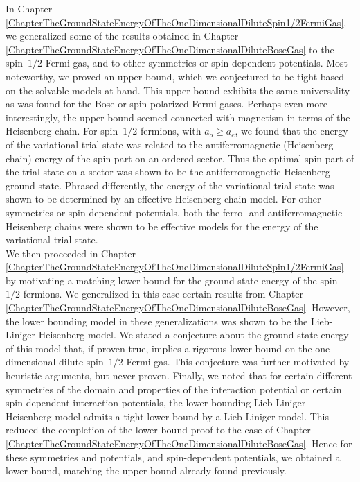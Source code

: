 In Chapter \ref{ChapterTheGroundStateEnergyOfTheOneDimensionalDiluteSpin1/2FermiGas}, we generalized some of the results obtained in Chapter \ref{ChapterTheGroundStateEnergyOfTheOneDimensionalDiluteBoseGas} to the spin--$ 1/2 $ Fermi gas, and to other symmetries or spin-dependent potentials. Most noteworthy, we proved an upper bound, which we conjectured to be tight based on the solvable models at hand. This upper bound exhibits the same universality as was found for the Bose or spin-polarized Fermi gases. Perhaps even more interestingly, the upper bound seemed connected with magnetism in terms of the Heisenberg chain. For spin--$ 1/2 $ fermions, with $ a_o\geq a_e $, we found that the energy of the variational trial state was related to the antiferromagnetic (Heisenberg chain) energy of the spin part on an ordered sector. Thus the optimal spin part of the trial state on a sector was shown to be the antiferromagnetic Heisenberg ground state. Phrased differently, the energy of the variational trial state was shown to be determined by an effective Heisenberg chain model. For other symmetries or spin-dependent potentials, both the ferro- and antiferromagnetic Heisenberg chains were shown to be effective models for the energy of the variational trial state.\\
We then proceeded in Chapter \ref{ChapterTheGroundStateEnergyOfTheOneDimensionalDiluteSpin1/2FermiGas} by motivating a matching lower bound for the ground state energy of the spin--$ 1/2 $ fermions. We generalized in this case certain results from Chapter \ref{ChapterTheGroundStateEnergyOfTheOneDimensionalDiluteBoseGas}. However, the lower bounding model in these generalizations was shown to be the Lieb-Liniger-Heisenberg model. We stated a conjecture about the ground state energy of this model that, if proven true, implies a rigorous lower bound on the one dimensional dilute spin--$ 1/2 $ Fermi gas. This conjecture was further motivated by heuristic arguments, but never proven. Finally, we noted that for certain different symmetries of the domain and properties of the interaction potential or certain spin-dependent interaction potentials, the lower bounding Lieb-Liniger-Heisenberg model admits a tight lower bound by a Lieb-Liniger model. This reduced the completion of the lower bound proof to the case of Chapter \ref{ChapterTheGroundStateEnergyOfTheOneDimensionalDiluteBoseGas}. Hence for these symmetries and potentials, and spin-dependent potentials, we obtained a lower bound, matching the upper bound already found previously.

